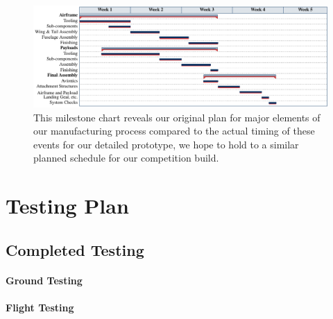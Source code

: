\documentclass[report]{byu-aero}
\begin{document}
\begin{figure}[h!]
	\centering
	\includegraphics[]{manufacturingchart.pdf}
	\caption{This milestone chart reveals our {\color{\BYUblue}original plan} for major elements of our manufacturing process compared to the {\color{\BYUred}actual timing} of these events for our detailed prototype, we hope to hold to a similar planned schedule for our competition build.}
	\label{fig:plannedvsactualtimingmanufacturing}
\end{figure}



\section{Testing Plan} %
\label{sec:TestingPlan}


\subsection{Completed Testing}
\label{ssec:completedtesting}




\paragraph{Ground Testing}
\label{sssec:groundtesting}



\paragraph{Flight Testing}
\label{sssec:flighttesting}
\end{document}
